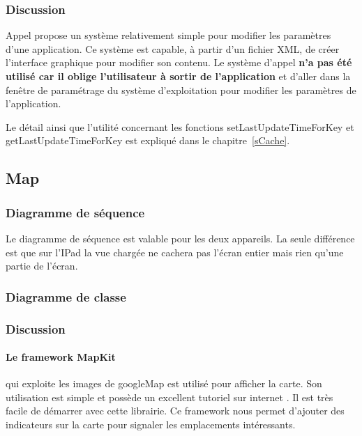 		\subsubsection*{Discussion}

		Appel propose un système relativement simple pour modifier les paramètres d'une application. Ce système est capable, à partir d'un fichier XML, de créer l'interface graphique pour modifier son contenu. Le système d'appel \textbf{n'a pas été utilisé car il oblige l'utilisateur à sortir de l'application }et d'aller dans la fenêtre de paramétrage du système d'exploitation pour modifier les paramètres de l'application.  
		
		Le détail ainsi que l'utilité concernant les fonctions setLastUpdateTimeForKey et getLastUpdateTimeForKey est expliqué dans le chapitre~\ref{sCache}.

		
	\subsection{Map}
		\subsubsection*{Diagramme de séquence}
			Le diagramme de séquence est valable pour les deux appareils. La seule différence est que sur l'IPad la vue chargée  ne cachera pas l'écran entier mais rien qu'une partie de l'écran.
		\subsubsection*{Diagramme de classe}
		\subsubsection*{Discussion}
		\paragraph{Le framework MapKit}
		qui exploite les images de googleMap est utilisé pour afficher la carte. Son utilisation est simple et possède un excellent tutoriel sur internet \cite{tutoNet}. Il est très facile de démarrer avec cette librairie. Ce framework nous permet d'ajouter des indicateurs sur la carte pour signaler les emplacements intéressants. 


